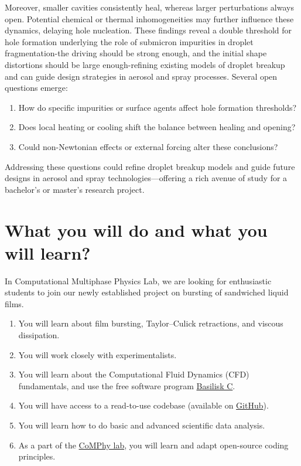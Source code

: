 \documentclass[11pt]{article}
\begin{document}
Moreover, smaller cavities consistently heal, whereas larger perturbations always open. Potential chemical or thermal inhomogeneities may further influence these dynamics, delaying hole nucleation. These findings reveal a double threshold for hole formation underlying the role of submicron impurities in droplet fragmentation-the driving should be strong enough, and the initial shape distortions should be large enough-refining existing models of droplet breakup and can guide design strategies in aerosol and spray processes.
Several open questions emerge: 

\begin{enumerate}
    \item How do specific impurities or surface agents affect hole formation thresholds? 
    \item Does local heating or cooling shift the balance between healing and opening?
    \item  Could non-Newtonian effects or external forcing alter these conclusions?
\end{enumerate}

Addressing these questions could refine droplet breakup models and guide future designs in aerosol and spray technologies—offering a rich avenue of study for a bachelor's or master's research project.

\section*{What you will do and what you will learn?}
In Computational Multiphase Physics Lab, we are looking for enthusiastic students to join our newly established project on bursting of sandwiched liquid films.

\begin{enumerate}
\item You will learn about film bursting, Taylor--Culick retractions, and viscous dissipation. 
\item You will work closely with experimentalists. 
\item You will learn about the Computational Fluid Dynamics (CFD) fundamentals, and use the free software program \href{http://basilisk.fr}{Basilisk C}.
\item You will have access to a read-to-use codebase (available on \href{https://github.com/comphy-lab/bubbleinSheet}{GitHub}).
\item You will learn how to do basic and advanced scientific data analysis.
\item As a part of the \href{https://comphy-lab.org}{CoMPhy lab}, you will learn and adapt open-source coding principles. 
\end{enumerate}
\end{document}
